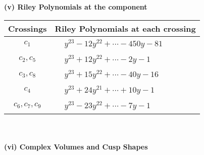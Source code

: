 \documentclass[1p]{elsarticle_modified}
\theoremstyle{definition}
\begin{document}
\flushleft \textbf{(v) Riley Polynomials at the component}\newline \\
\begin{tabular}{m{50pt}|m{274pt}}
Crossings & \hspace{64pt}Riley Polynomials at each crossing \\
\hline $$\begin{aligned}c_{1}\end{aligned}$$&$\begin{aligned}
&y^{23}-12 y^{22}+\cdots-450 y-81
\end{aligned}$\\
\hline $$\begin{aligned}c_{2},c_{5}\end{aligned}$$&$\begin{aligned}
&y^{23}+12 y^{22}+\cdots-2 y-1
\end{aligned}$\\
\hline $$\begin{aligned}c_{3},c_{8}\end{aligned}$$&$\begin{aligned}
&y^{23}+15 y^{22}+\cdots-40 y-16
\end{aligned}$\\
\hline $$\begin{aligned}c_{4}\end{aligned}$$&$\begin{aligned}
&y^{23}+24 y^{21}+\cdots+10 y-1
\end{aligned}$\\
\hline $$\begin{aligned}c_{6},c_{7},c_{9}\end{aligned}$$&$\begin{aligned}
&y^{23}-23 y^{22}+\cdots-7 y-1
\end{aligned}$\\
\hline
\end{tabular}\\~\\
\newpage\flushleft \textbf{(vi) Complex Volumes and Cusp Shapes}
\end{document}
